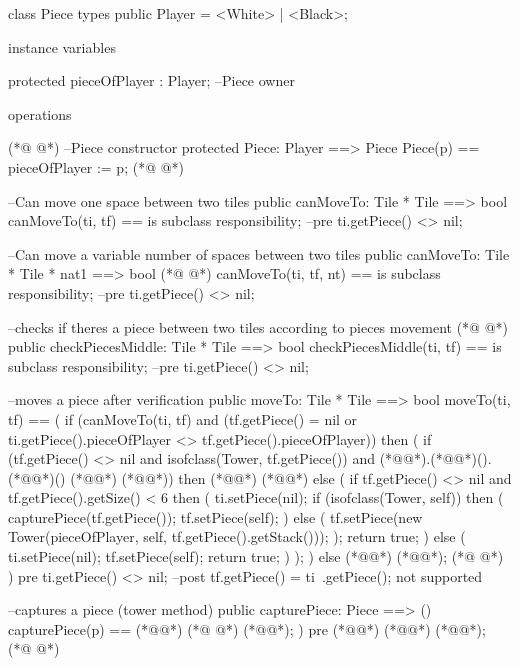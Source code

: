 \begin{vdmpp}[breaklines=true]
class Piece
types
  public Player = <White> | <Black>; 

instance variables

  protected pieceOfPlayer : Player; --Piece owner
  
operations

(*@
\label{Piece:11}
@*)
  --Piece constructor
  protected Piece: Player ==> Piece
  Piece(p) == pieceOfPlayer := p;
(*@
\label{canMoveTo:14}
@*)
  
  --Can move one space between two tiles
  public canMoveTo: Tile * Tile ==> bool
  canMoveTo(ti, tf) == is subclass responsibility;
  --pre ti.getPiece() <> nil;
  
  --Can move a variable number of spaces between two tiles
  public canMoveTo: Tile * Tile * nat1 ==> bool
(*@
\label{checkPiecesMiddle:22}
@*)
  canMoveTo(ti, tf, nt) == is subclass responsibility;
  --pre ti.getPiece() <> nil;
  
  --checks if theres a piece between two tiles according to pieces movement
(*@
\label{moveTo:26}
@*)
  public checkPiecesMiddle: Tile * Tile ==> bool
  checkPiecesMiddle(ti, tf) == is subclass responsibility;
  --pre ti.getPiece() <> nil;
  
  --moves a piece after verification 
  public moveTo: Tile * Tile ==> bool
  moveTo(ti, tf) == (
    if (canMoveTo(ti, tf) and (tf.getPiece() = nil or ti.getPiece().pieceOfPlayer <> tf.getPiece().pieceOfPlayer))
    then (
     if (tf.getPiece() <> nil and isofclass(Tower, tf.getPiece()) and (*@@*).(*@@*)().(*@@*)() (*@\vdmnotcovered{>}@*) (*@@*))
     then (*@@*) (*@@*)
     else (
      if tf.getPiece() <> nil and tf.getPiece().getSize() < 6
      then (
       ti.setPiece(nil);
       if (isofclass(Tower, self)) then (
        capturePiece(tf.getPiece());
        tf.setPiece(self);
       )
       else (
        tf.setPiece(new Tower(pieceOfPlayer, self, tf.getPiece().getStack()));
       );
       return true;
      )
      else (
       ti.setPiece(nil);
       tf.setPiece(self);
       return true;
      )
     );
    )
    else (*@@*) (*@@*);
(*@
\label{capturePiece:58}
@*)
  )
  pre ti.getPiece() <> nil;
  --post tf.getPiece() = ti~.getPiece(); not supported 
  
  --captures a piece (tower method)
  public capturePiece: Piece ==> ()
  capturePiece(p) == (*@\vdmnotcovered{(}@*)
(*@
\label{getPlayer:65}
@*)
   (*@@*);
  )
  pre (*@@*) (*@\vdmnotcovered{<>}@*) (*@@*);
(*@
\label{getStack:68}
@*)
  

\end{vdmpp}
